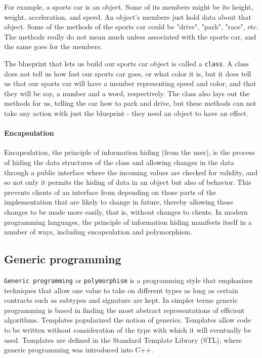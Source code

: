 For example, a sports car is an object. Some of its members might be its
height, weight, acceleration, and speed. An object's members just hold data
about that object. Some of the methods of the sports car could be "drive",
"park", "race", etc. The methods really do not mean much unless associated with
the sports car, and the same goes for the members.

The blueprint that lets us build our sports car object is called a
\texttt{class}. A class does not tell us how fast our sports car goes, or what
color it is, but it does tell us that our sports car will have a member
representing speed and color, and that they will be say, a number and a word,
respectively. The class also lays out the methods for us, telling the car how
to park and drive, but these methods can not take any action with just the
blueprint - they need an object to have an effect.

\paragraph{Encapsulation}
Encapsulation, the principle of information hiding (from
the user), is the process of hiding the data structures of the class and
allowing changes in the data through a public interface where the incoming
values are checked for validity, and so not only it permits the hiding of data
in an object but also of behavior. This prevents clients of an interface from
depending on those parts of the implementation that are likely to change in
future, thereby allowing those changes to be made more easily, that is, without
changes to clients. In modern programming languages, the principle of
information hiding manifests itself in a number of ways, including
encapsulation and polymorphism.

\subsection{Generic programming}
\texttt{Generic programming} or \texttt{polymorphism} is
a programming style that emphasizes techniques that allow one value to take on
different types as long as certain contracts such as subtypes and
signature are kept. In simpler terms generic
programming is based in finding the most abstract representations of efficient
algorithms. Templates popularized the notion of
generics. Templates allow code to be written without consideration of the
type with which it will eventually be used. Templates are defined in
the Standard Template Library (STL), where generic
programming was introduced into C++.

